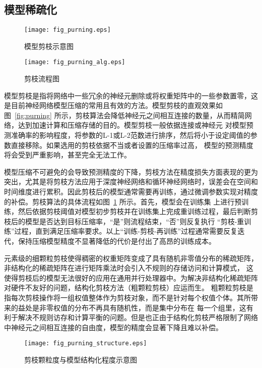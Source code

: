 \subsection{模型稀疏化}

\begin{figure}
	\centering
	\begin{minipage}[t]{0.48\textwidth}
		\centering
		\texttt{[image: fig\_purning.eps]}
		\caption{模型剪枝示意图}
		\label{fig:purning}
	\end{minipage}
	\begin{minipage}[t]{0.48\textwidth}
		\centering
		\texttt{[image: fig\_purning\_alg.eps]}
		\caption{剪枝流程图}
		\label{fig:purning_alg}
	\end{minipage}
\end{figure}
模型剪枝是指将网络中一些冗余的神经元删除或将权重矩阵中的一些参数置零，这是目前神经网络模型压缩的常用且有效的方法。模型剪枝的直观效果如
图~\ref{fig:purning} 所示，剪枝算法会降低神经元之间相互连接的数量，从而精简网络，达到加速计算和压缩存储的目的。模型剪枝一般依据连接或神经元
对模型预测准确率的影响程度，将参数的L-1或L-2范数进行排序，然后将小于设定阈值的参数直接移除。如果选用的剪枝依据不当或者设置的压缩率过高，
模型的预测精度将会受到严重影响，甚至完全无法工作。

模型压缩不可避免的会导致预测精度的下降，剪枝方法在精度损失方面表现的更为突出，尤其是将剪枝方法应用于深度神经网络和循环神经网络时，误差会在空间和
时间维度进行累积。因此剪枝后的模型通常需要再训练，通过微调参数实现对精度的补偿。剪枝算法的具体流程如图~\ref{fig:purning_alg} 所示。首先，模型会在训练集
上进行预训练，然后依据剪枝阈值对模型初步剪枝并在训练集上完成重训练过程，最后判断剪枝后的模型是否达到目标压缩率，“是”则流程结束，“否”则反复执行
“剪枝-重训练”过程，直到满足压缩率要求。以上“训练-剪枝-再训练”过程通常需要反复迭代，保持压缩模型精度不显著降低的代价是付出了高昂的训练成本。

元素级的细颗粒剪枝使得稠密的权重矩阵变成了具有随机非零值分布的稀疏矩阵，非结构化的稀疏矩阵在进行矩阵乘法时会引入不规则的存储访问和计算模式，
这使得剪枝后的模型无法很好的应用在通用并行处理器中。为解决非结构化稀疏矩阵对硬件不友好的问题，结构化剪枝方法（粗颗粒剪枝）应运而生。
粗颗粒剪枝是指每次剪枝操作将一组权值整体作为剪枝对象，而不是针对每个权值个体。其所带来的益处是非零权值的分布不再具有随机性，而是集中分布在
每一个组里，这有利于解决不规则访存和计算平衡的问题。但是也正由于结构化剪枝严格限制了网络中神经元之间相互连接的自由度，模型的精度会显著下降且难以补偿。
\begin{figure}
	\centering
	\texttt{[image: fig\_purning\_structure.eps]}
	\caption{剪枝颗粒度与模型结构化程度示意图}
	\label{fig:struc_purn}
\end{figure}

